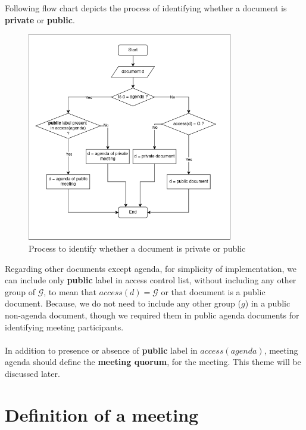 \documentclass{article}
\begin{document}
\noindent
Following flow chart depicts the process of identifying whether a document is \textbf{private} or \textbf{public}.
\begin{figure}[H]
    \centering
    \includegraphics[width=0.8\textwidth]{./image/document_puclic_vs_private_classification.png}
    \caption{Process to identify whether a document is private or public}
    \label{fig:process to identify whether a document is private or public}
\end{figure} 

\noindent
Regarding other documents except agenda, for simplicity of implementation, we can include only \textbf{public} label in access control list, without including any other group of $\mathcal{G}$, to mean that $access(d) = \mathcal{G}$ or that document is a public document. Because, we do not need to include any other group ($g$) in a public non-agenda document, though we required them in public agenda documents for identifying meeting participants.\\ \\
\noindent
In addition to presence or absence of \textbf{public} label in $access(agenda)$, meeting agenda should define the \textbf{meeting quorum}, for the meeting. This theme will be discussed later.

\section{Definition of a meeting}
\end{document}
